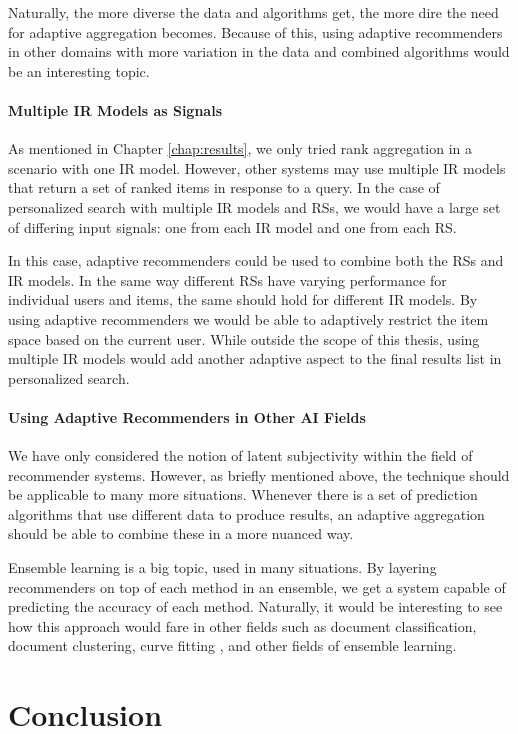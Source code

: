 Naturally, the more diverse the data and algorithms get,
the more dire the need for adaptive aggregation becomes.
Because of this, using adaptive recommenders in other domains with more variation 
in the data and combined algorithms would be an interesting topic.


\paragraph{Multiple IR Models as Signals}
As mentioned in Chapter \ref{chap:results},
we only tried rank aggregation in a scenario with one IR model.
However, other systems may use multiple IR models
that return a set of ranked items in response to a query.
In the case of personalized search with multiple IR models
and RSs, we would have a large set of differing
input signals:
one from each IR model and one from each RS.

In this case, adaptive recommenders could be used to combine
both the RSs and IR models.
In the same way different RSs have varying performance
for individual users and items, the same should hold
for different IR models.
By using adaptive recommenders we would be able
to adaptively restrict the item space based on the 
current user.
While outside the scope of this thesis,
using multiple IR models would add another adaptive
aspect to the final results list in personalized search.


\paragraph{Using Adaptive Recommenders in Other AI Fields}
We have only considered the notion of latent subjectivity within the field of recommender systems.
However, as briefly mentioned above, the technique should be applicable to many more situations.
Whenever there is a set of prediction algorithms that use different data to produce results,
an adaptive aggregation should be able to combine these in a more nuanced way.

Ensemble learning is a big topic, used in many situations.
By layering recommenders on top of each method in an ensemble, 
we get a system capable of predicting the accuracy of each method.
Naturally, it would be interesting to see how this approach would fare
in other fields such as document classification, document clustering,
curve fitting \cite[p7]{Polikar2006}, and other fields of ensemble learning.


\clearpage
\section{Conclusion}

